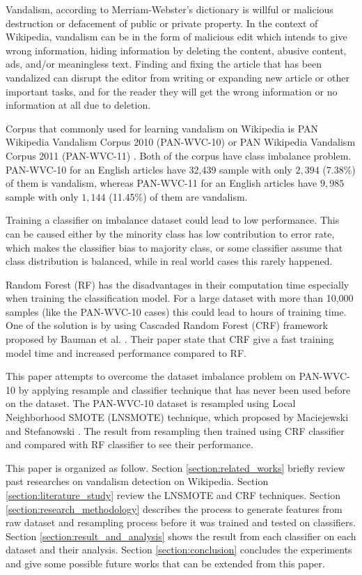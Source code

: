 Vandalism, according to Merriam-Webster's dictionary is willful or malicious
destruction or defacement of public or private property.
In the context of Wikipedia, vandalism can be in the form of malicious edit
which intends to give wrong information, hiding information by deleting
the content, abusive content, ads, and/or meaningless text.
Finding and fixing the article that has been vandalized can disrupt the editor
from writing or expanding new article or other important tasks, and for the
reader they will get the wrong information or no information at all due to
deletion.

Corpus that commonly used for learning vandalism on Wikipedia is PAN Wikipedia
Vandalism Corpus 2010 (PAN-WVC-10)
\cite{potthast:2010b}
or PAN Wikipedia Vandalism Corpus 2011 (PAN-WVC-11)
\cite{potthast:2010b}.
Both of the corpus have class imbalance problem.
PAN-WVC-10 for an English articles have 32,439 sample with only $2,394$ (7.38\%)
of them is vandalism, whereas PAN-WVC-11 for an English articles have $9,985$
sample with only $1,144$ (11.45\%) of them are vandalism.

Training a classifier on imbalance dataset could lead to low performance.
This can be caused either by the minority class has low contribution to error
rate, which makes the classifier bias to majority class, or some classifier
assume that class distribution is balanced, while in real world cases this
rarely happened.

Random Forest (RF) has the disadvantages in their computation time
especially when training the classification model.  For a large dataset with
more than 10,000 samples (like the PAN-WVC-10 cases) this could lead to hours
of training time.  One of the solution is by using Cascaded Random Forest (CRF)
framework proposed by Bauman et al. \cite{baumann2013cascaded}.
Their paper state that CRF give a fast training model time and increased
performance compared to RF.

This paper attempts to overcome the dataset imbalance problem on PAN-WVC-10 by
applying resample and classifier technique that has never been used before on
the dataset.
The PAN-WVC-10 dataset is resampled using Local Neighborhood SMOTE (LNSMOTE)
technique,
which proposed by Maciejewski and Stefanowski
\cite{maciejewski2011local}.
The result from resampling then trained using CRF classifier and compared with
RF classifier to see their performance.

This paper is organized as follow.
Section \ref{section:related_works} briefly review past researches on vandalism
detection on Wikipedia.
Section \ref{section:literature_study} review the LNSMOTE and CRF techniques.
Section \ref{section:research_methodology} describes the process to generate
features from raw dataset and resampling process before it was trained and
tested on classifiers.
Section \ref{section:result_and_analysis} shows the result from each classifier
on each dataset and their analysis.
Section \ref{section:conclusion} concludes the experiments and
give some possible future works that can be extended from this paper.

